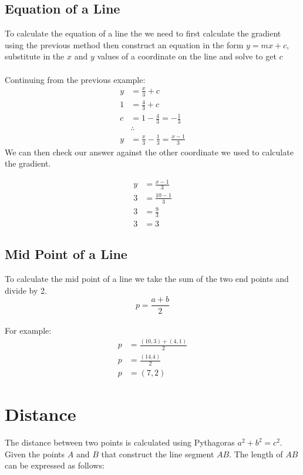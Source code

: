 \documentclass[a4paper]{article}
\begin{document}
\subsection{Equation of a Line}
To calculate the equation of a line the we need to first calculate the gradient using the previous method
then construct an equation in the form $y = mx + c$, substitute in the $x$ and $y$ values of a coordinate on the
line and solve to get $c$
\\\\
Continuing from the previous example:
\begin{align*}
	y &= \frac{x}{3} + c\\
	1 &= \frac{4}{3} + c\\
	c &= 1 - \frac{4}{3} = -\frac{1}{3}\\
	&\therefore\\
	y &= \frac{x}{3} - \frac{1}{3} = \frac{x - 1}{3}
\end{align*}
We can then check our answer against the other coordinate we used to calculate the gradient.

\begin{align*}
	y &= \frac{x - 1}{3}\\
	3 &= \frac{10 - 1}{3}\\
	3 &= \frac{9}{3}\\
	3 &= 3
\end{align*}

\subsection{Mid Point of a Line}
To calculate the mid point of a line we take the sum of the two end points and divide by 2.
\begin{equation}
	p = \frac{a + b}{2}
\end{equation}
\\
For example:
\begin{align*}
	p &= \frac{(10, 3) + (4, 1)}{2}\\
	p &= \frac{(14. 4)}{2}\\
	p &= (7, 2)
\end{align*}

\pagebreak

\section{Distance}
The distance between two points is calculated using Pythagoras $a^2 + b^2 = c^2$.\\
Given the points $A$ and $B$ that construct the line segment $AB$. The length of $AB$ can be expressed as follows:
\end{document}
